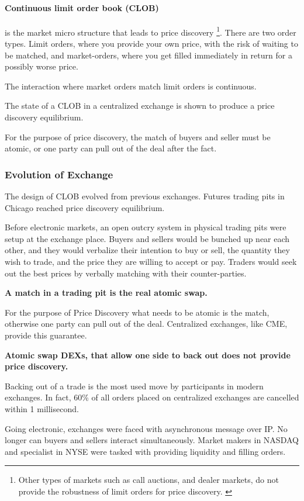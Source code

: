\documentclass[12pt]{article}
\begin{document}
\paragraph*{Continuous limit order book (CLOB)}is the market micro structure that leads to price discovery \footnote{Other types of markets such as call auctions, and dealer markets, do not provide the robustness of limit orders for price discovery. \cite{RePEc:hal:journl:hal-00459785}}. There are two order types. Limit orders, where you provide your own price, with the risk of waiting to be matched, and market-orders, where you get filled immediately in return for a possibly worse price.

The interaction where market orders match limit orders is continuous. 

The state of a CLOB in a centralized exchange is shown to produce a price discovery equilibrium. 

For the purpose of price discovery, the match of buyers and seller must be atomic, or one party can pull out of the deal after the fact. 

\subsubsection*{Evolution of Exchange}
The design of CLOB evolved from previous exchanges. Futures trading pits in Chicago reached price discovery equilibrium.  

Before electronic markets, an open outcry system in physical trading pits were setup at the exchange place. Buyers and sellers would be bunched up near each other, and they would verbalize their intention to buy or sell, the quantity they wish to trade, and the price they are willing to accept or pay. Traders would seek out the best prices by verbally matching with their counter-parties. 

\textbf{A match in a trading pit is the real atomic swap.} 

For the purpose of Price Discovery what needs to be atomic is the match, otherwise one party can pull out of the deal. Centralized exchanges, like CME, provide this guarantee. 

\textbf{Atomic swap DEXs, that allow one side to back out does not provide price discovery.}

Backing out of a trade is the most used move by participants in modern exchanges. In fact, 60\%  of all orders placed on centralized exchanges are cancelled within 1 millisecond.  

Going electronic, exchanges were faced with asynchronous message over IP. No longer can buyers and sellers interact simultaneously. Market makers in NASDAQ and specialist in NYSE were tasked with providing liquidity and filling orders. 
\end{document}
